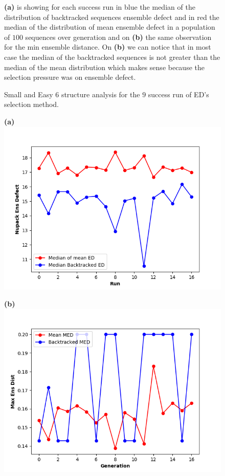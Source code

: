 \documentclass[english,12pt,a4paper]{article}
\theoremstyle{definition}
\begin{document}
\begin{figure}[H]
	\caption{Small and Easy 6 structure analysis for the $9$ success run of  ED's selection method.}\label{Fig:SUM2-SE6}
	\medskip
	\small
	\textbf{(a)} is showing for each success run in blue the median of the distribution of backtracked sequences ensemble defect and in red the median of the distribution of mean ensemble defect in a population of $100$  sequences over generation and on  \textbf{(b)} the same observation for the min ensemble distance. On \textbf{(b)} we can notice that in most case the median of the backtracked  sequences is not greater than the median of the mean distribution which makes sense because the selection pressure was on ensemble defect.
	
	
\end{figure}
\begin{figure}[H] 
	\vspace{-0.5cm}
	\hspace{-1.2cm}
	\begin{minipage}{0.60\textwidth}
		\centering
		\textbf{(a)}\label{Fig:small1}
		\includegraphics[width=.9\linewidth]{images/data-17-MED/stat1-48}
	\end{minipage}\hfill
	\begin{minipage}{0.6\textwidth}
		\centering
		
		\textbf{(b)}\label{Fig:small2}
		\includegraphics[width=.9\linewidth]{images/data-17-MED/stat4-48}
	\end{minipage}
	

\end{figure}
\end{document}
